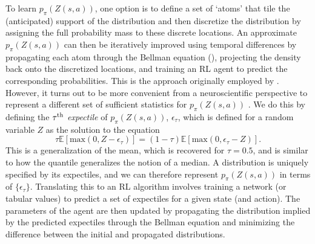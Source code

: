 To learn $p_\pi(Z(s, a))$, one option is to define a set of `atoms' that tile the (anticipated) support of the distribution and then discretize the distribution by assigning the full probability mass to these discrete locations.
An approximate $p_\pi(Z(s, a))$ can then be iteratively improved using temporal differences by propagating each atom through the Bellman equation (), projecting the density back onto the discretized locations, and training an RL agent to predict the corresponding probabilities.
This is the approach originally employed by \citet{bellemare2017distributional}.
However, it turns out to be more convenient from a neuroscientific perspective to represent a different set of sufficient statistics for $p_\pi(Z(s, a))$ \citep{dabney2020distributional,lowet2020distributional}.
We do this by defining the $\tau\textsuperscript{th}$ \emph{expectile} of $p_\pi(Z(s, a))$, $\epsilon_\tau$, which is defined for a random variable $Z$ as the solution to the equation
\begin{equation}
    \tau \mathbb{E} [\text{max}(0, Z - \epsilon_\tau)] = (1-\tau) \mathbb{E} [\text{max}(0, \epsilon_\tau - Z)].
\end{equation}
This is a generalization of the mean, which is recovered for $\tau = 0.5$, and is similar to how the quantile generalizes the notion of a median.
A distribution is uniquely specified by its expectiles, and we can therefore represent $p_\pi(Z(s, a))$ in terms of $\{\epsilon_\tau\}$.
Translating this to an RL algorithm involves training a network (or tabular values) to predict a set of expectiles for a given state (and action).
The parameters of the agent are then updated by propagating the distribution implied by the predicted expectiles through the Bellman equation and minimizing the difference between the initial and propagated distributions.

